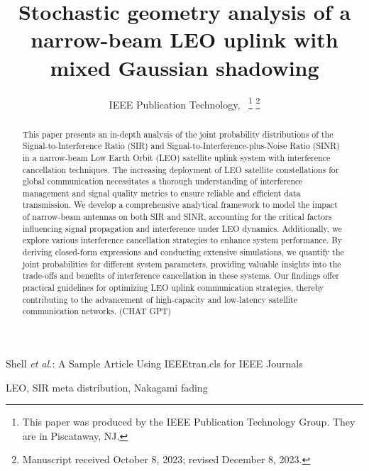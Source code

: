\documentclass[lettersize,journal]{IEEEtran}
\begin{document}
\title{Stochastic geometry analysis of a narrow-beam LEO uplink with mixed Gaussian shadowing}
\author{IEEE Publication Technology,~
\thanks{This paper was produced by the IEEE Publication Technology Group. They are in Piscataway, NJ.}%
\thanks{Manuscript received October 8, 2023; revised December 8, 2023.}}

%
{Shell \MakeLowercase{\textit{et al.}}: A Sample Article Using IEEEtran.cls for IEEE Journals}

\IEEEpubid{}


\maketitle
\begin{abstract}
  This paper presents an in-depth analysis of the joint probability distributions of the Signal-to-Interference Ratio (SIR) and Signal-to-Interference-plus-Noise Ratio (SINR) in a narrow-beam Low Earth Orbit (LEO) satellite uplink system with interference cancellation techniques. The increasing deployment of LEO satellite constellations for global communication necessitates a thorough understanding of interference management and signal quality metrics to ensure reliable and efficient data transmission. We develop a comprehensive analytical framework to model the impact of narrow-beam antennas on both SIR and SINR, accounting for the critical factors influencing signal propagation and interference under LEO dynamics. Additionally, we explore various interference cancellation strategies to enhance system performance. By deriving closed-form expressions and conducting extensive simulations, we quantify the joint probabilities for different system parameters, providing valuable insights into the trade-offs and benefits of interference cancellation in these systems. Our findings offer practical guidelines for optimizing LEO uplink communication strategies, thereby contributing to the advancement of high-capacity and low-latency satellite communication networks. (CHAT GPT)
\end{abstract}

\begin{IEEEkeywords}
  LEO, SIR meta distribution, Nakagami fading
\end{IEEEkeywords}
\end{document}
